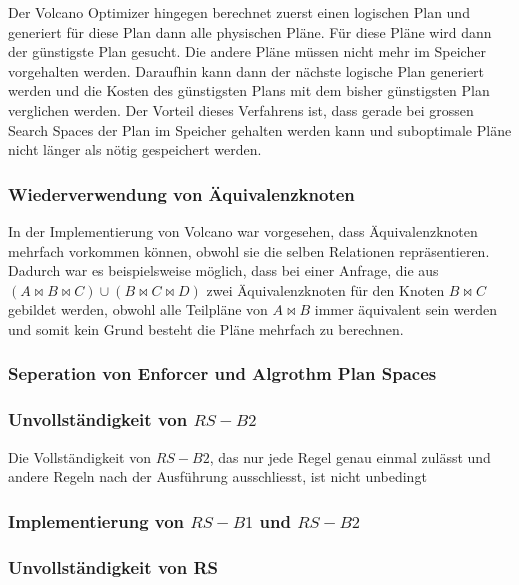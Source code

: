 Der Volcano Optimizer hingegen berechnet zuerst einen logischen Plan und generiert für diese Plan dann alle physischen Pläne. Für diese Pläne wird dann der günstigste Plan gesucht. Die andere Pläne müssen nicht mehr im Speicher vorgehalten werden. Daraufhin kann dann der nächste logische Plan generiert werden und die Kosten des günstigsten Plans mit dem bisher günstigsten Plan verglichen werden. Der Vorteil dieses Verfahrens ist, dass gerade bei grossen Search Spaces der Plan im Speicher gehalten werden kann und suboptimale Pläne nicht länger als nötig gespeichert werden.

\subsubsection{Wiederverwendung von Äquivalenzknoten}

In der Implementierung von Volcano war vorgesehen, dass Äquivalenzknoten mehrfach vorkommen können, obwohl sie die selben Relationen repräsentieren. Dadurch war es beispielsweise möglich, dass bei einer Anfrage, die aus $(A \Join B \Join C) \cup (B \Join C \Join D)$ zwei Äquivalenzknoten für den Knoten $B \Join C$ gebildet werden, obwohl alle Teilpläne von $A \Join B$ immer äquivalent sein werden und somit kein Grund besteht die Pläne mehrfach zu berechnen.

\subsubsection{Seperation von Enforcer und Algrothm Plan Spaces}


\subsubsection{Unvollständigkeit von $RS-B2$}

Die Vollständigkeit von $RS-B2$, das nur jede Regel genau einmal zulässt und andere Regeln nach der Ausführung ausschliesst, ist nicht unbedingt 

\subsubsection{Implementierung von $RS-B1$ und $RS-B2$}







\subsubsection{Unvollständigkeit von RS}


